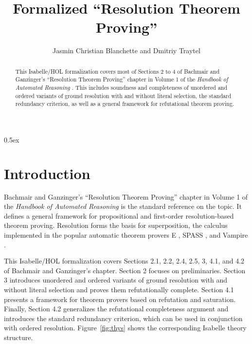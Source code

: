 \documentclass[10pt,a4paper]{article}
\begin{document}
\title{Formalized ``Resolution Theorem Proving''}
\author{Jasmin Christian Blanchette and Dmitriy Traytel}

\maketitle

\begin{abstract}
\noindent
This Isabelle/HOL formalization covers most of Sections 2 to 4 of Bachmair and
Ganzinger's ``Resolution Theorem Proving'' chapter
\cite{bachmair-ganzinger-2001} in Volume 1 of the \emph{Handbook of Automated
Reasoning} \cite{robinson-voronkov-2001-vol1}. This includes soundness and
completeness of unordered and ordered variants of ground resolution with and
without literal selection, the standard redundancy criterion, as well as a
general framework for refutational theorem proving.
\end{abstract}

\tableofcontents

\parindent 0pt
\parskip 0.5ex

\section{Introduction}

Bachmair and Ganzinger's ``Resolution Theorem Proving'' chapter
\cite{bachmair-ganzinger-2001} in Volume 1 of the \emph{Handbook of Automated
Reasoning} \cite{robinson-voronkov-2001-vol1} is the standard reference on the
topic. It defines a general framework for propositional and first-order
resolution-based theorem proving. Resolution forms the basis for superposition,
the calculus implemented in the popular automatic theorem provers E
\cite{schulz-2013}, SPASS \cite{weidenbach-et-al-2009}, and Vampire
\cite{hoder-voronkov-2010}.

\medskip

This Isabelle/HOL formalization covers Sections 2.1, 2.2, 2.4, 2.5, 3, 4.1, and
4.2 of Bachmair and Ganzinger's chapter. Section 2 focuses on preliminaries.
Section 3 introduces unordered and ordered variants of ground resolution with
and without literal selection and proves them refutationally complete. Section
4.1 presents a framework for theorem provers based on refutation and saturation.
Finally, Section 4.2 generalizes the refutational completeness argument and
introduces the standard redundancy criterion, which can be used in conjunction
with ordered resolution. Figure~\ref{fig:thys} shows the corresponding Isabelle
theory structure.
\end{document}
